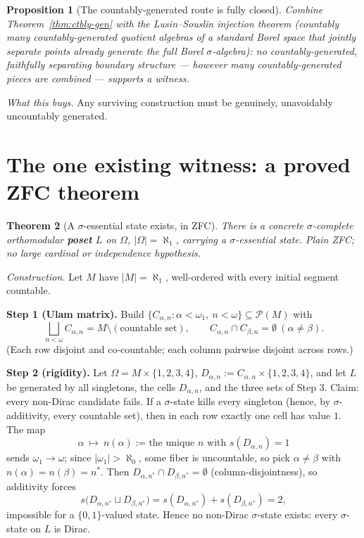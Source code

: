 \documentclass[11pt]{article}
\newtheorem{theorem}{Theorem}[section]
\newtheorem{proposition}[theorem]{Proposition}
\theoremstyle{remark}
\begin{document}
\begin{proposition}[The countably-generated route is fully closed]
\label{prop:ctbly-gen-full}
Combine Theorem~\ref{thm:ctbly-gen} with the Lusin--Souslin injection theorem
(countably many countably-generated quotient algebras of a standard Borel
space that jointly separate points already generate the full Borel
$\sigma$-algebra): no countably-generated, faithfully separating boundary
structure — however many countably-generated pieces are combined — supports
a witness.
\end{proposition}

\emph{What this buys.} Any surviving construction must be genuinely,
unavoidably uncountably generated.

\section{The one existing witness: a proved ZFC theorem}

\begin{theorem}[A $\sigma$-essential state exists, in ZFC]
\label{thm:main}
There is a concrete $\sigma$-complete orthomodular \textbf{poset} $L$ on
$\Omega$, $|\Omega|=\aleph_1$, carrying a $\sigma$-essential state. Plain
ZFC; no large cardinal or independence hypothesis.
\end{theorem}

\emph{Construction.} Let $M$ have $|M|=\aleph_1$, well-ordered with every
initial segment countable.

\smallskip
\noindent\textbf{Step 1 (Ulam matrix).} Build $\{C_{\alpha,n} :
\alpha<\omega_1,\ n<\omega\}\subseteq \mathcal P(M)$ with
\[
  \bigsqcup_{n<\omega} C_{\alpha,n} = M \setminus (\text{countable set}),
  \qquad
  C_{\alpha,n}\cap C_{\beta,n} = \emptyset\ (\alpha\neq\beta).
\]
(Each row disjoint and co-countable; each column pairwise disjoint across
rows.)

\smallskip
\noindent\textbf{Step 2 (rigidity).} Let $\Omega = M\times\{1,2,3,4\}$,
$D_{\alpha,n} := C_{\alpha,n}\times\{1,2,3,4\}$, and let $L$ be generated by
all singletons, the cells $D_{\alpha,n}$, and the three sets of Step 3. Claim:
every non-Dirac candidate fails. If a $\sigma$-state kills every singleton
(hence, by $\sigma$-additivity, every countable set), then in each row
exactly one cell has value $1$. The map
\[
  \alpha \ \longmapsto\ n(\alpha) := \text{the unique } n \text{ with }
  s(D_{\alpha,n})=1
\]
sends $\omega_1\to\omega$; since $|\omega_1|>\aleph_0$, some fiber is
uncountable, so pick $\alpha\neq\beta$ with $n(\alpha)=n(\beta)=n^\ast$. Then
$D_{\alpha,n^\ast}\cap D_{\beta,n^\ast}=\emptyset$ (column-disjointness), so
additivity forces
\[
  s\big(D_{\alpha,n^\ast}\sqcup D_{\beta,n^\ast}\big) = s(D_{\alpha,n^\ast}) +
  s(D_{\beta,n^\ast}) = 2,
\]
impossible for a $\{0,1\}$-valued state. Hence no non-Dirac $\sigma$-state
exists: every $\sigma$-state on $L$ is Dirac.
\end{document}

